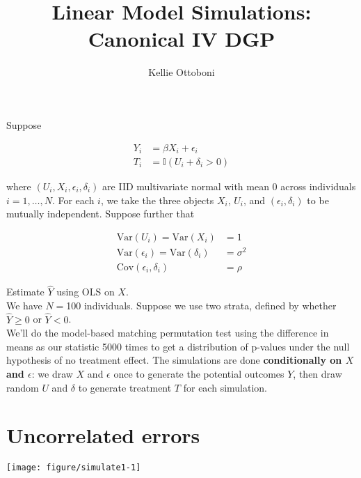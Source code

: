 \documentclass[11pt]{article}\usepackage[]{graphicx}\usepackage[]{color}
\title{Linear Model Simulations: Canonical IV DGP}
\author{Kellie Ottoboni}
\makeatletter
\def\maxwidth{ %
  \ifdim\Gin@nat@width>\linewidth
    \linewidth
  \else
    \Gin@nat@width
  \fi
}
\newenvironment{knitrout}{}{} %
\makeatother
\begin{document}
\maketitle


Suppose

\begin{align*}
Y_i &= \beta X_i + \epsilon_i \\
T_i &= \mathbb{I}(U_i + \delta_i > 0)
\end{align*}

where $(U_i, X_i, \epsilon_i, \delta_i)$ are IID multivariate normal with mean $0$ across individuals $i = 1,\dots, N$.  For each $i$, we take the three objects $X_i$, $U_i$, and $(\epsilon_i, \delta_i)$ to be mutually independent. Suppose further that

\begin{align*}
\text{Var}(U_i) = \text{Var}(X_i) &= 1 \\
\text{Var}(\epsilon_i) = \text{Var}(\delta_i) &= \sigma^2 \\
\text{Cov}(\epsilon_i, \delta_i) &= \rho
\end{align*}

Estimate $\hat{Y}$ using OLS on $X$. \\



We have $N=$100 individuals.  Suppose we use two strata, defined by whether $\hat{Y} \geq 0$ or $\hat{Y} < 0$.  \\

We'll do the model-based matching permutation test using the difference in means as our statistic 5000 times to get a distribution of p-values under the null hypothesis of no treatment effect. The simulations are done \textbf{conditionally on $X$ and $\epsilon$}: we draw $X$ and $\epsilon$ once to generate the potential outcomes $Y$, then draw random $U$ and $\delta$ to generate treatment $T$ for each simulation.






\section{Uncorrelated errors}


\begin{knitrout}
\color{fgcolor}

{\centering \texttt{[image: figure/simulate1-1]} 

}



\end{knitrout}
\end{document}
